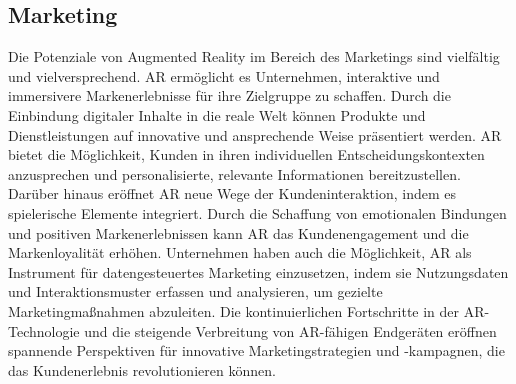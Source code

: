 \subsection{Marketing}
Die Potenziale von Augmented Reality im Bereich des Marketings sind
vielfältig und vielversprechend. AR ermöglicht es Unternehmen, interaktive und
immersivere Markenerlebnisse für ihre Zielgruppe zu schaffen. Durch die
Einbindung digitaler Inhalte in die reale Welt können Produkte und
Dienstleistungen auf innovative und ansprechende Weise präsentiert werden. AR
bietet die Möglichkeit, Kunden in ihren individuellen Entscheidungskontexten
anzusprechen und personalisierte, relevante Informationen bereitzustellen.
Darüber hinaus eröffnet AR neue Wege der Kundeninteraktion, indem es
spielerische Elemente integriert. Durch die Schaffung von emotionalen Bindungen
und positiven Markenerlebnissen kann AR das Kundenengagement und die
Markenloyalität erhöhen. Unternehmen haben auch die Möglichkeit, AR als
Instrument für datengesteuertes Marketing einzusetzen, indem sie Nutzungsdaten
und Interaktionsmuster erfassen und analysieren, um gezielte Marketingmaßnahmen
abzuleiten. Die kontinuierlichen Fortschritte in der AR-Technologie und die
steigende Verbreitung von AR-fähigen Endgeräten eröffnen spannende Perspektiven
für innovative Marketingstrategien und -kampagnen, die das Kundenerlebnis
revolutionieren können.\cite{chylinski2020augmented,rauschnabel2019augmented}

